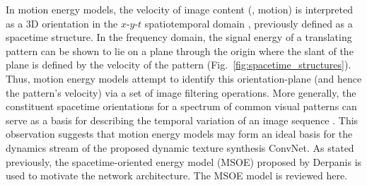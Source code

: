 In motion energy models, the velocity of image content (\ie, motion)
is interpreted as a 3D orientation in the $x$-$y$-$t$
spatiotemporal domain
\cite{adelson1985spatiotemporal,fahle1981,heeger1988,simoncelli1998,watson1983}, previously defined as a spacetime structure.
In the frequency domain, the signal energy of a translating
pattern can be shown to lie on a plane through the origin
where the slant of the plane is defined by the velocity of
the pattern (Fig.\ \ref{fig:spacetime_structures}).
Thus, motion energy models attempt to identify this 
orientation-plane (and hence the pattern's velocity) via
a set of image filtering operations.
More generally,
the constituent
spacetime orientations for a spectrum of common
visual patterns can serve as a basis for describing the temporal
variation of an image sequence \cite{derpanis2012spacetime}.
This observation suggests that motion energy models may form an
ideal basis for the dynamics stream of the proposed dynamic texture synthesis ConvNet. As stated previously, the spacetime-oriented energy model (MSOE) proposed by Derpanis \etal \cite{derpanis2010role,derpanis2012spacetime} is used to motivate the network architecture. The MSOE model is reviewed here.

